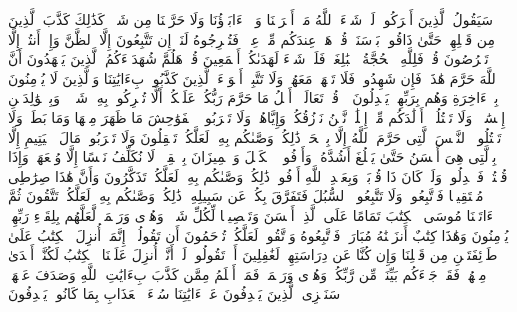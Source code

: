 \stopbuffer%
\startbuffer[\q:6:148]
سَیَقُولُ ٱلَّذِینَ أَشۡرَكُوا۟ لَوۡ شَاۤءَ ٱللَّهُ مَاۤ أَشۡرَكۡنَا وَلَاۤ ءَابَاۤؤُنَا وَلَا حَرَّمۡنَا مِن شَیۡءࣲۚ كَذَٰلِكَ كَذَّبَ ٱلَّذِینَ مِن قَبۡلِهِمۡ حَتَّىٰ ذَاقُوا۟ بَأۡسَنَاۗ قُلۡ هَلۡ عِندَكُم مِّنۡ عِلۡمࣲ فَتُخۡرِجُوهُ لَنَاۤۖ إِن تَتَّبِعُونَ إِلَّا ٱلظَّنَّ وَإِنۡ أَنتُمۡ إِلَّا تَخۡرُصُونَ%
\stopbuffer%
\startbuffer[\q:6:149]
قُلۡ فَلِلَّهِ ٱلۡحُجَّةُ ٱلۡبَٰلِغَةُۖ فَلَوۡ شَاۤءَ لَهَدَىٰكُمۡ أَجۡمَعِینَ%
\stopbuffer%
\startbuffer[\q:6:150]
قُلۡ هَلُمَّ شُهَدَاۤءَكُمُ ٱلَّذِینَ یَشۡهَدُونَ أَنَّ ٱللَّهَ حَرَّمَ هَٰذَاۖ فَإِن شَهِدُوا۟ فَلَا تَشۡهَدۡ مَعَهُمۡۚ وَلَا تَتَّبِعۡ أَهۡوَاۤءَ ٱلَّذِینَ كَذَّبُوا۟ بِءَایَٰتِنَا وَٱلَّذِینَ لَا یُؤۡمِنُونَ بِٱلۡءَاخِرَةِ وَهُم بِرَبِّهِمۡ یَعۡدِلُونَ%
\stopbuffer%
\startbuffer[\q:6:151]
۞ قُلۡ تَعَالَوۡا۟ أَتۡلُ مَا حَرَّمَ رَبُّكُمۡ عَلَیۡكُمۡۖ أَلَّا تُشۡرِكُوا۟ بِهِۦ شَیۡءࣰاۖ وَبِٱلۡوَٰلِدَیۡنِ إِحۡسَٰنࣰاۖ وَلَا تَقۡتُلُوۤا۟ أَوۡلَٰدَكُم مِّنۡ إِمۡلَٰقࣲ نَّحۡنُ نَرۡزُقُكُمۡ وَإِیَّاهُمۡۖ وَلَا تَقۡرَبُوا۟ ٱلۡفَوَٰحِشَ مَا ظَهَرَ مِنۡهَا وَمَا بَطَنَۖ وَلَا تَقۡتُلُوا۟ ٱلنَّفۡسَ ٱلَّتِی حَرَّمَ ٱللَّهُ إِلَّا بِٱلۡحَقِّۚ ذَٰلِكُمۡ وَصَّىٰكُم بِهِۦ لَعَلَّكُمۡ تَعۡقِلُونَ%
\stopbuffer%
\startbuffer[\q:6:152]
وَلَا تَقۡرَبُوا۟ مَالَ ٱلۡیَتِیمِ إِلَّا بِٱلَّتِی هِیَ أَحۡسَنُ حَتَّىٰ یَبۡلُغَ أَشُدَّهُۥۚ وَأَوۡفُوا۟ ٱلۡكَیۡلَ وَٱلۡمِیزَانَ بِٱلۡقِسۡطِۖ لَا نُكَلِّفُ نَفۡسًا إِلَّا وُسۡعَهَاۖ وَإِذَا قُلۡتُمۡ فَٱعۡدِلُوا۟ وَلَوۡ كَانَ ذَا قُرۡبَىٰۖ وَبِعَهۡدِ ٱللَّهِ أَوۡفُوا۟ۚ ذَٰلِكُمۡ وَصَّىٰكُم بِهِۦ لَعَلَّكُمۡ تَذَكَّرُونَ%
\stopbuffer%
\startbuffer[\q:6:153]
وَأَنَّ هَٰذَا صِرَٰطِی مُسۡتَقِیمࣰا فَٱتَّبِعُوهُۖ وَلَا تَتَّبِعُوا۟ ٱلسُّبُلَ فَتَفَرَّقَ بِكُمۡ عَن سَبِیلِهِۦۚ ذَٰلِكُمۡ وَصَّىٰكُم بِهِۦ لَعَلَّكُمۡ تَتَّقُونَ%
\stopbuffer%
\startbuffer[\q:6:154]
ثُمَّ ءَاتَیۡنَا مُوسَى ٱلۡكِتَٰبَ تَمَامًا عَلَى ٱلَّذِیۤ أَحۡسَنَ وَتَفۡصِیلࣰا لِّكُلِّ شَیۡءࣲ وَهُدࣰى وَرَحۡمَةࣰ لَّعَلَّهُم بِلِقَاۤءِ رَبِّهِمۡ یُؤۡمِنُونَ%
\stopbuffer%
\startbuffer[\q:6:155]
وَهَٰذَا كِتَٰبٌ أَنزَلۡنَٰهُ مُبَارَكࣱ فَٱتَّبِعُوهُ وَٱتَّقُوا۟ لَعَلَّكُمۡ تُرۡحَمُونَ%
\stopbuffer%
\startbuffer[\q:6:156]
أَن تَقُولُوۤا۟ إِنَّمَاۤ أُنزِلَ ٱلۡكِتَٰبُ عَلَىٰ طَاۤئِفَتَیۡنِ مِن قَبۡلِنَا وَإِن كُنَّا عَن دِرَاسَتِهِمۡ لَغَٰفِلِینَ%
\stopbuffer%
\startbuffer[\q:6:157]
أَوۡ تَقُولُوا۟ لَوۡ أَنَّاۤ أُنزِلَ عَلَیۡنَا ٱلۡكِتَٰبُ لَكُنَّاۤ أَهۡدَىٰ مِنۡهُمۡۚ فَقَدۡ جَاۤءَكُم بَیِّنَةࣱ مِّن رَّبِّكُمۡ وَهُدࣰى وَرَحۡمَةࣱۚ فَمَنۡ أَظۡلَمُ مِمَّن كَذَّبَ بِءَایَٰتِ ٱللَّهِ وَصَدَفَ عَنۡهَاۗ سَنَجۡزِی ٱلَّذِینَ یَصۡدِفُونَ عَنۡ ءَایَٰتِنَا سُوۤءَ ٱلۡعَذَابِ بِمَا كَانُوا۟ یَصۡدِفُونَ%
\stopbuffer%
\startbuffer[\q:6:158]
